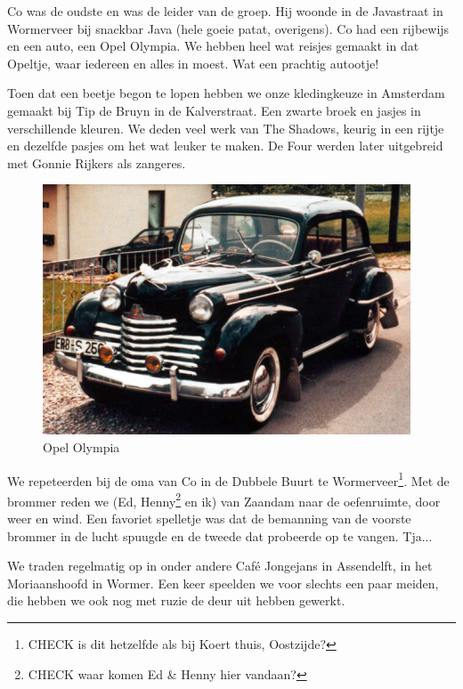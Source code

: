 \documentclass[12pt,twoside, openright]{memoir}
\begin{document}
Co was de oudste en was de leider van de groep. Hij woonde in de Javastraat in Wormerveer bij snackbar Java (hele goeie patat, overigens). Co had een rijbewijs en een auto, een Opel Olympia. We hebben heel wat reisjes gemaakt in dat Opeltje, waar iedereen en alles in moest. Wat een prachtig autootje!

Toen dat een beetje begon te lopen hebben we onze kledingkeuze in Amsterdam gemaakt bij Tip de Bruyn in de Kalverstraat. Een zwarte broek en jasjes in verschillende kleuren. We deden veel werk van The Shadows, keurig in een rijtje en dezelfde pasjes om het wat leuker te maken. De Four werden later uitgebreid met Gonnie Rijkers als zangeres. 

\begin{figure}
\includegraphics[width=\textwidth]{img/ch26/opel_olympia_big}
\caption*{\footnotesize Opel Olympia}
\end{figure}

We repeteerden bij de oma van Co in de Dubbele Buurt te Wormerveer\footnote{CHECK is dit hetzelfde als bij Koert thuis, Oostzijde?}. Met de brommer reden we (Ed, Henny\footnote{CHECK waar komen Ed & Henny hier vandaan?} en ik) van Zaandam naar de oefenruimte, door weer en wind. Een favoriet spelletje was dat de bemanning van de voorste brommer in de lucht spuugde en de tweede dat probeerde op te vangen. Tja...

We traden regelmatig op in onder andere Café Jongejans in Assendelft, in het Moriaanshoofd in Wormer. Een keer speelden we voor slechts een paar meiden, die hebben we ook nog met ruzie de deur uit hebben gewerkt. 
\end{document}
